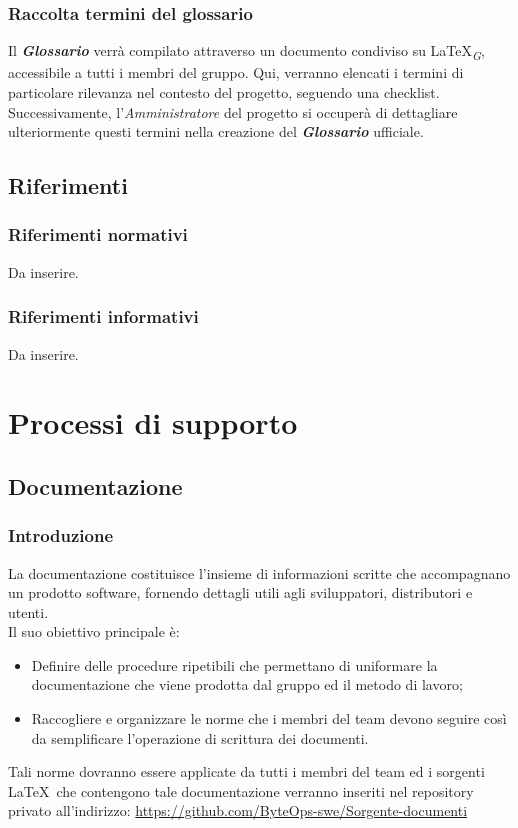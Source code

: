 \documentclass{article}
\begin{document}
\subsubsection{Raccolta termini del glossario}
Il \textbf{\textit{Glossario}} verrà compilato attraverso un documento condiviso su \LaTeX \textsubscript{\textit{G}}, accessibile a tutti i membri del gruppo. Qui, verranno elencati i termini di particolare rilevanza nel contesto del progetto, seguendo una checklist. Successivamente, l'\textit{Amministratore} del progetto si occuperà di dettagliare ulteriormente questi termini nella creazione del \textbf{\textit{Glossario}} ufficiale.

\subsection{Riferimenti}
\subsubsection{Riferimenti normativi}
Da inserire.
\subsubsection{Riferimenti informativi}
Da inserire.

\section{Processi di supporto}

\subsection{Documentazione}
    
    \subsubsection{Introduzione}
    La documentazione costituisce l'insieme di informazioni scritte che accompagnano un prodotto software, fornendo dettagli utili agli sviluppatori, distributori e utenti.\\
    Il suo obiettivo principale è:
    \begin{itemize}
    \item  Definire delle procedure ripetibili che permettano di uniformare la documentazione che viene prodotta dal gruppo ed il metodo di lavoro;
    \item  Raccogliere e organizzare le norme che i membri del team devono seguire così da semplificare l'operazione di scrittura dei documenti.
    \end{itemize}
    Tali norme dovranno essere applicate da tutti i membri del team ed i sorgenti \LaTeX\ che contengono tale documentazione verranno inseriti nel repository privato all'indirizzo:
    \href{https://github.com/ByteOps-swe/Sorgente-documenti}{https://github.com/ByteOps-swe/Sorgente-documenti}
    
\end{document}

